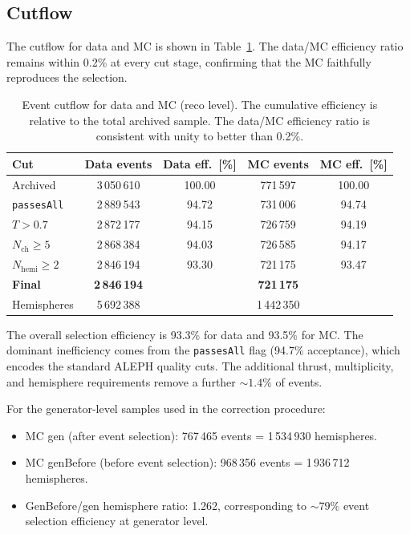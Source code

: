 \documentclass[11pt,a4paper]{article}
\begin{document}
\subsection{Cutflow}
\label{sec:cutflow}

The cutflow for data and MC is shown in Table~\ref{tbl:cutflow}.
The data/MC efficiency ratio remains within 0.2\% at every cut stage,
confirming that the MC faithfully reproduces the selection.

\begin{table}[htbp]
\centering
\caption{Event cutflow for data and MC (reco level).  The cumulative
  efficiency is relative to the total archived sample.  The data/MC
  efficiency ratio is consistent with unity to better than 0.2\%.}
\label{tbl:cutflow}
\begin{tabular}{lcccc}
\toprule
Cut & Data events & Data eff.\ [\%] & MC events & MC eff.\ [\%] \\
\midrule
Archived & 3\,050\,610 & 100.00 & 771\,597 & 100.00 \\
\texttt{passesAll} & 2\,889\,543 & 94.72 & 731\,006 & 94.74 \\
$T > 0.7$ & 2\,872\,177 & 94.15 & 726\,759 & 94.19 \\
$N_\text{ch} \ge 5$ & 2\,868\,384 & 94.03 & 726\,585 & 94.17 \\
$N_\text{hemi} \ge 2$ & 2\,846\,194 & 93.30 & 721\,175 & 93.47 \\
\midrule
\textbf{Final} & \textbf{2\,846\,194} & & \textbf{721\,175} & \\
Hemispheres & 5\,692\,388 & & 1\,442\,350 & \\
\bottomrule
\end{tabular}
\end{table}

The overall selection efficiency is 93.3\% for data and 93.5\% for MC.
The dominant inefficiency comes from the \texttt{passesAll} flag
(94.7\% acceptance), which encodes the standard ALEPH quality cuts.
The additional thrust, multiplicity, and hemisphere requirements remove
a further $\sim\!1.4\%$ of events.

For the generator-level samples used in the correction procedure:
\begin{itemize}
\item MC gen (after event selection): 767\,465 events = 1\,534\,930
  hemispheres.
\item MC genBefore (before event selection): 968\,356 events =
  1\,936\,712 hemispheres.
\item GenBefore/gen hemisphere ratio: 1.262, corresponding to
  $\sim\!79\%$ event selection efficiency at generator level.
\end{itemize}
\end{document}
